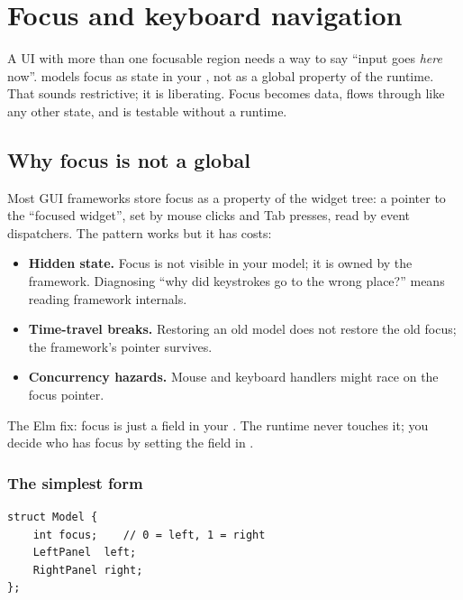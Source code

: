 \chapter{Focus and keyboard navigation}
\label{ch:focus}

\begin{aside}
A UI with more than one focusable region needs a way to say
``input goes \emph{here} now''. \maya{} models focus as state in
your , not as a global property of the runtime.
That sounds restrictive; it is liberating. Focus becomes data,
flows through  like any other state, and is
testable without a runtime.
\end{aside}

\section{Why focus is not a global}

Most GUI frameworks store focus as a property of the widget
tree: a pointer to the ``focused widget'', set by mouse clicks
and Tab presses, read by event dispatchers. The pattern works
but it has costs:

\begin{itemize}[leftmargin=*]
  \item \textbf{Hidden state.} Focus is not visible in your
    model; it is owned by the framework. Diagnosing ``why did
    keystrokes go to the wrong place?'' means reading framework
    internals.
  \item \textbf{Time-travel breaks.} Restoring an old model does
    not restore the old focus; the framework's pointer survives.
  \item \textbf{Concurrency hazards.} Mouse and keyboard handlers
    might race on the focus pointer.
\end{itemize}

The Elm fix: focus is just a field in your . The
runtime never touches it; you decide who has focus by setting
the field in .

\subsection*{The simplest form}

\begin{lstlisting}
struct Model {
    int focus;    // 0 = left, 1 = right
    LeftPanel  left;
    RightPanel right;
};
\end{lstlisting}

